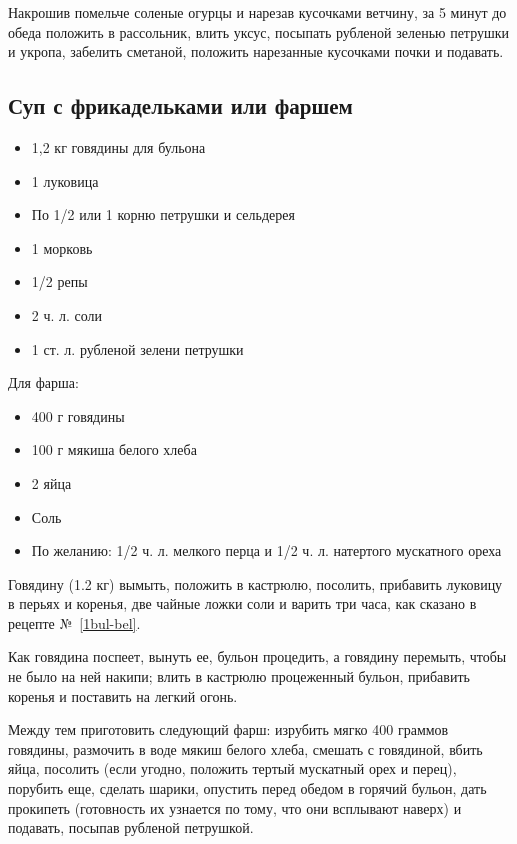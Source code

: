 Накрошив помельче соленые огурцы и нарезав кусочками ветчину, за 5 минут до обеда положить в рассольник, влить уксус, посыпать рубленой зеленью петрушки и укропа, забелить сметаной, положить нарезанные кусочками почки и подавать.

\subsection{Суп с фрикадельками или фаршем}\label{35sup-frik}

\begin{itemize}
	\item 1,2 кг говядины для бульона
    \item 1 луковица
    \item По 1/2 или 1 корню петрушки и сельдерея
    \item 1 морковь
    \item 1/2 репы 
    \item 2 ч. л. соли
    \item 1 ст. л. рубленой зелени петрушки
\end{itemize}

Для фарша: 

\begin{itemize}
	\item 400 г говядины
    \item 100 г мякиша белого хлеба
    \item 2 яйца
    \item Соль
    \item По желанию: 1/2 ч. л. мелкого перца и 1/2 ч. л. натертого мускатного ореха
\end{itemize}

Говядину (1.2 кг) вымыть, положить в кастрюлю, посолить, прибавить луковицу в перьях и коренья, две чайные ложки соли и варить три часа, как сказано в рецепте №~\ref{1bul-bel}.

Как говядина поспеет, вынуть ее, бульон процедить, а говядину перемыть, чтобы не было на ней накипи; влить в кастрюлю процеженный бульон, прибавить коренья и поставить на легкий огонь.

Между тем приготовить следующий фарш: изрубить мягко 400 граммов говядины, размочить в воде мякиш белого хлеба, смешать с говядиной, вбить яйца, посолить (если угодно, положить тертый мускатный орех и перец), порубить еще, сделать шарики, опустить перед обедом в горячий бульон, дать прокипеть (готовность их узнается по тому, что они всплывают наверх) и подавать, посыпав рубленой петрушкой.

